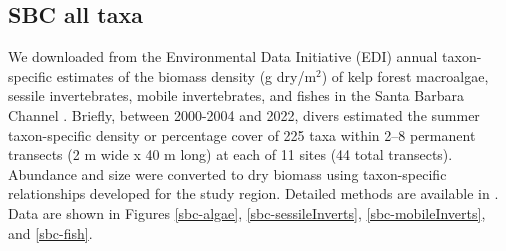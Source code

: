 \documentclass[11pt, oneside]{article}
\begin{document}
%
%


%
\subsection {SBC all taxa}
We downloaded from the Environmental Data Initiative (EDI) annual taxon-specific estimates of the biomass density (g dry/m$^2$) of kelp forest macroalgae, sessile invertebrates, mobile invertebrates, and fishes in the Santa Barbara Channel \citep{sbc}.
Briefly, between 2000-2004 and 2022, divers estimated the summer taxon-specific density or percentage cover of 225 taxa within 2–8 permanent transects (2 m wide x 40 m long) at each of 11 sites (44 total transects). 
Abundance and size were converted to dry biomass using taxon-specific relationships developed for the study region. 
Detailed methods are available in \citep{Harrer2013, Reed2016, sbc}.
Data are shown in Figures \ref{sbc-algae},  \ref{sbc-sessileInverts}, \ref{sbc-mobileInverts}, and \ref{sbc-fish}.
\end{document}
